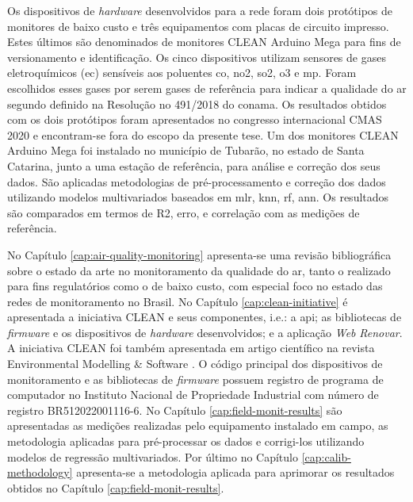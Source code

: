Os dispositivos de \textit{hardware} desenvolvidos para a rede foram dois protótipos de monitores de baixo custo e três equipamentos com placas de circuito impresso. Estes últimos são denominados de monitores CLEAN Arduino Mega para fins de versionamento e identificação. Os cinco dispositivos utilizam sensores de gases eletroquímicos (\gls{ec}) sensíveis aos poluentes \acrshort{co}, \acrshort{no2}, \acrshort{so2}, \acrshort{o3} e \acrshort{mp}. Foram escolhidos esses gases por serem gases de referência para indicar a qualidade do ar segundo definido na Resolução no 491/2018 do \gls{conama}. Os resultados obtidos com os dois protótipos foram apresentados no congresso internacional CMAS 2020 \cite{Campo2020DEPLOYMENTRESULTS} e encontram-se fora do escopo da presente tese. Um dos monitores CLEAN Arduino Mega foi instalado no município de Tubarão, no estado de Santa Catarina, junto a uma estação de referência, para análise e correção dos seus dados. São aplicadas metodologias de pré-processamento e correção dos dados utilizando modelos multivariados baseados em \gls{mlr}, \gls{knn}, \gls{rf}, \gls{ann}. Os resultados são comparados em termos de R2, erro, e correlação com as medições de referência. 

No Capítulo \ref{cap:air-quality-monitoring} apresenta-se uma revisão bibliográfica sobre o estado da arte no monitoramento da qualidade do ar, tanto o realizado para fins regulatórios como o de baixo custo, com especial foco no estado das redes de monitoramento no Brasil. No Capítulo \ref{cap:clean-initiative} é apresentada a iniciativa CLEAN e seus componentes, i.e.: a \acrshort{api}; as bibliotecas de \textit{firmware} e os dispositivos de \textit{hardware} desenvolvidos; e a aplicação \textit{Web} \textit{Renovar}. A iniciativa CLEAN foi também apresentada em artigo científico na revista Environmental Modelling \& Software \cite{Campo2021}. O código principal dos dispositivos de monitoramento e as bibliotecas de \textit{firmware} possuem registro de programa de computador no Instituto Nacional de Propriedade Industrial com número de registro BR512022001116-6. No Capítulo \ref{cap:field-monit-results} são apresentadas as medições realizadas pelo equipamento instalado em campo, as metodologia aplicadas para pré-processar os dados e corrigi-los utilizando modelos de regressão multivariados. Por último no Capítulo \ref{cap:calib-methodology} apresenta-se a metodologia aplicada para aprimorar os resultados obtidos no Capítulo \ref{cap:field-monit-results}.